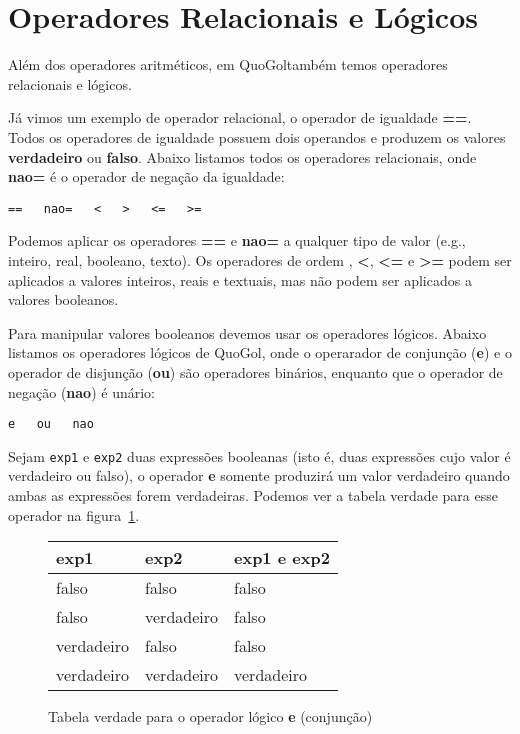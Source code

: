 \documentclass{report}
\newcommand{\Qgol}{QuoGol\;}
\begin{document}
\section{Operadores Relacionais e Lógicos}

Além dos operadores aritméticos, em \Qgol também temos operadores
relacionais e lógicos.

Já vimos um exemplo de operador relacional, o operador de igualdade
\textbf{==}. Todos os operadores de igualdade possuem dois operandos
e produzem os valores \textbf{verdadeiro} ou \textbf{falso}. Abaixo
listamos todos os operadores relacionais, onde \textbf{nao=} é o
operador de negação da igualdade:
\begin{verbatim}
==   nao=   <   >   <=   >=
\end{verbatim}

Podemos aplicar os operadores \textbf{==} e \textbf{nao=} a qualquer
tipo de valor (e.g., inteiro, real, booleano, texto). Os operadores
de ordem {\bf }, {\bf <}, {\bf <=} e {\bf >=} podem ser aplicados
a valores inteiros, reais e textuais, mas não podem ser aplicados
a valores booleanos. 

Para manipular valores booleanos devemos usar os operadores lógicos.
Abaixo listamos os operadores lógicos de \Qgol, onde o operarador
de conjunção (\textbf{e}) e o operador de disjunção (\textbf{ou})
são operadores binários, enquanto que o operador de negação (\textbf{nao})
é unário:
\begin{verbatim}
e   ou   nao
\end{verbatim}

Sejam \texttt{exp1} e \texttt{exp2} duas expressões booleanas (isto é,
duas expressões cujo valor é verdadeiro ou falso), o operador \textbf{e}
somente produzirá um valor verdadeiro quando ambas as expressões forem
verdadeiras. Podemos ver a tabela verdade para esse operador na
figura~\ref{tab:ope}.

\begin{figure}
\centering
\begin{tabular}{|l|l|l|}
\hline
exp1 & exp2 & exp1 {\bf e} exp2 \\ \hline
falso & falso & falso \\ \hline
falso & verdadeiro & falso \\ \hline
verdadeiro & falso & falso \\ \hline
verdadeiro & verdadeiro & verdadeiro \\ \hline
\end{tabular}
\label{tab:ope}
\caption{Tabela verdade para o operador lógico {\bf e} (conjunção)}
\end{figure}
\end{document}
